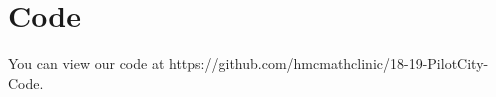 \chapter{Code}
\label{ch:code-samples}

You can view our code at https://github.com/hmcmathclinic/18-19-PilotCity-Code. 

